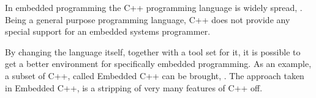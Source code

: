 

In embedded programming the C++ programming language is widely spread, \cite{embedlangs}. Being a general purpose 
programming language, C++ does not provide any special support for an embedded systems programmer. 

By changing  the language itself, together with a tool set for it, it is possible to get a better environment 
for specifically embedded programming. As an example, a subset of C++, called Embedded C++ can be brought, \cite{emcpp}.
The approach taken in Embedded C++, is a stripping of very many features of C++ off.


